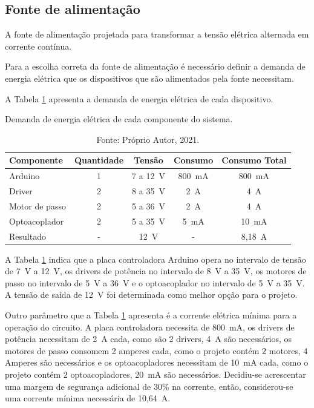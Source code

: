 \subsection{Fonte de alimentação}\label{subsec:metfonte}

A fonte de alimentação projetada para transformar a tensão elétrica alternada em corrente contínua.

Para a escolha correta da fonte de alimentação é necessário definir a demanda de energia elétrica 
que os dispositivos que são alimentados pela fonte necessitam.

A Tabela \ref{tab:demandafonte} apresenta a demanda de energia elétrica de cada dispositivo.

\begin{table}[H]
    \centering
    \caption{Demanda de energia elétrica de cada componente do sistema.}
    \begin{tabular}{lcccc}
        \hline
        \textbf{Componente} & \textbf{Quantidade} & \textbf{Tensão} & \textbf{Consumo} & \textbf{Consumo Total}\\
        \hline
        Arduino & 1 & 7 a 12~V & 800~mA & 800~mA\\
        Driver & 2 & 8 a 35~V & 2~A & 4~A\\
        Motor de passo & 2 & 5 a 36~V & 2~A & 4~A\\
        Optoacoplador & 2 & 5 a 35~V & 5~mA & 10~mA\\
        Resultado & - & 12~V & - & 8,18~A\\
        \hline       
    \end{tabular}
    \caption*{Fonte: Próprio Autor, 2021.}
    \label{tab:demandafonte}
\end{table}

A Tabela \ref{tab:demandafonte} indica que a placa controladora Arduino opera no intervalo de tensão de 7~V 
a 12~V, os drivers de potência no intervalo de 8~V a 35~V, os motores de passo no intervalo de 5~V a 36~V 
e o optoacoplador no intervalo de 5~V a 35~V. A tensão de saída de 12~V foi determinada como melhor 
opção para o projeto.

Outro parâmetro que a Tabela \ref{tab:demandafonte} apresenta é a corrente elétrica mínima para a operação 
do circuito. A placa controladora necessita de 800~mA, os drivers de potência necessitam de 2~A cada, 
como são 2 drivers, 4~A são necessários, os motores de passo consomem 2 amperes cada, como o projeto 
contém 2 motores, 4 Amperes são necessários e os optoacopladores necessitam de 10~mA cada, como o 
projeto contém 2 optoacopladores, 20~mA são necessários. Decidiu-se acrescentar uma margem de 
segurança adicional de 30\% na corrente, então, considerou-se uma corrente mínima necessária de 10,64~A.

